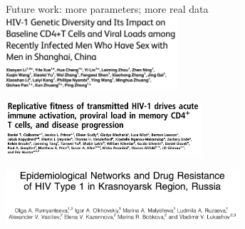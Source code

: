 \documentclass{beamer}
\begin{document}
\begin{frame}{Future work: more parameters; more real data}
  \vspace{-0.25cm}
  \colorbox{blue0}{\includegraphics[height=2.7cm]{figures/li}}

  \colorbox{blue0}{\includegraphics[height=2cm]{figures/claiborne}}

  \colorbox{blue0}{\includegraphics[height=2cm]{figures/rumyantseva}}
\end{frame}
\end{document}
